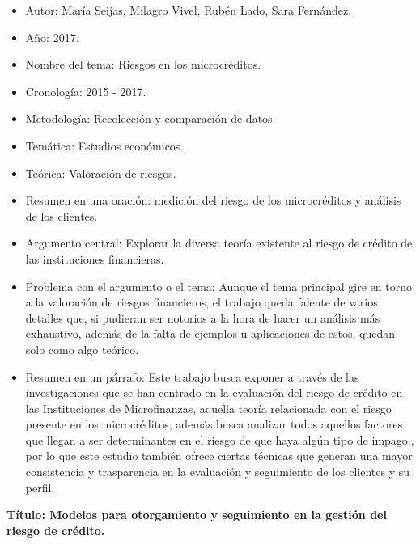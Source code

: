 \documentclass[
  letterpaper,
  DIV=11,
  numbers=noendperiod]{scrreprt}
\begin{document}
\begin{itemize}
\item
  Autor: María Seijas, Milagro Vivel, Rubén Lado, Sara Fernández.
\item
  Año: 2017.
\item
  Nombre del tema: Riesgos en los microcréditos.
\item
  Cronología: 2015 - 2017.
\item
  Metodología: Recolección y comparación de datos.
\item
  Temática: Estudios económicos.
\item
  Teórica: Valoración de riesgos.
\item
  Resumen en una oración: medición del riesgo de los microcréditos y
  análisis de los clientes.
\item
  Argumento central: Explorar la diversa teoría existente al riesgo de
  crédito de las instituciones financieras.
\item
  Problema con el argumento o el tema: Aunque el tema principal gire en
  torno a la valoración de riesgos financieros, el trabajo queda falente
  de varios detalles que, si pudieran ser notorios a la hora de hacer un
  análisis más exhaustivo, además de la falta de ejemplos u aplicaciones
  de estos, quedan solo como algo teórico.
\item
  Resumen en un párrafo: Este trabajo busca exponer a través de las
  investigaciones que se han centrado en la evaluación del riesgo de
  crédito en las Instituciones de Microfinanzas, aquella teoría
  relacionada con el riesgo presente en los microcréditos, además busca
  analizar todos aquellos factores que llegan a ser determinantes en el
  riesgo de que haya algún tipo de impago., por lo que este estudio
  también ofrece ciertas técnicas que generan una mayor consistencia y
  trasparencia en la evaluación y seguimiento de los clientes y su
  perfil.
\end{itemize}

\textbf{Título: Modelos para otorgamiento y seguimiento en la gestión
del riesgo de crédito. }
\end{document}

